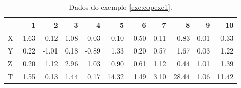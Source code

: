 \begin{table}[ht]
\centering
\caption{Dados do exemplo \ref{exe:copexe1}.} 
\label{tab:copexe1}
\begin{tabular}{lrrrrrrrrrr}
  \hline
 & 1 & 2 & 3 & 4 & 5 & 6 & 7 & 8 & 9 & 10 \\ 
  \hline
X & -1.63 & 0.12 & 1.08 & 0.03 & -0.10 & -0.50 & 0.11 & -0.83 & 0.01 & 0.33 \\ 
  Y & 0.22 & -1.01 & 0.18 & -0.89 & 1.33 & 0.20 & 0.57 & 1.67 & 0.03 & 1.22 \\ 
  Z & 0.20 & 1.12 & 2.96 & 1.03 & 0.90 & 0.61 & 1.12 & 0.44 & 1.01 & 1.39 \\ 
  T & 1.55 & 0.13 & 1.44 & 0.17 & 14.32 & 1.49 & 3.10 & 28.44 & 1.06 & 11.42 \\ 
   \hline
\end{tabular}
\end{table}

